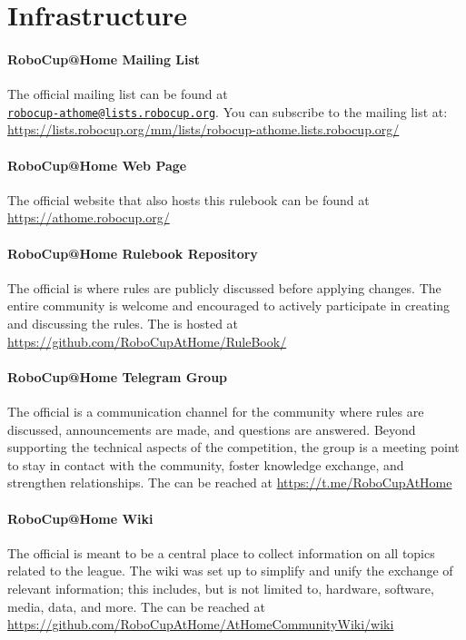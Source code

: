 \section{Infrastructure}\label{sec:introduction:infrastructure}

\paragraph{RoboCup@Home Mailing List}\label{sec:introduction:mailinglist}
The official \AtHome{} mailing list can be found at\\
\href{mailto:robocup-athome@lists.robocup.org}{\small\texttt{robocup-athome@lists.robocup.org}}.
You can subscribe to the mailing list at: {\small\url{https://lists.robocup.org/mm/lists/robocup-athome.lists.robocup.org/}}

\paragraph{RoboCup@Home Web Page}\label{sec:introduction:webpage}
The official \AtHome{} website that also hosts this rulebook can be found at {\small\url{https://athome.robocup.org/}}

\paragraph{RoboCup@Home Rulebook Repository}\label{sec:introduction:repo}
The official \AtHome{} \RR{} is where rules are publicly discussed before applying changes.
The entire \AtHome{} community is welcome and encouraged to actively participate in creating and discussing the rules.
The \RR{} is hosted at {\small\url{https://github.com/RoboCupAtHome/RuleBook/}}

\paragraph{RoboCup@Home Telegram Group}\label{sec:introduction:telegramgroup}
The official \AtHome{} \TG{} is a communication channel for the \AtHome{} community where rules are discussed, announcements are made, and questions are answered.
Beyond supporting the technical aspects of the competition, the group is a meeting point to stay in contact with the community, foster knowledge exchange, and strengthen relationships.
The \TG{} can be reached at {\small\url{https://t.me/RoboCupAtHome}}

\paragraph{RoboCup@Home Wiki}\label{sec:introduction:wiki}
The official \AtHome{} \WIKI{} is meant to be a central place to collect information on all topics related to the \AtHome{} league.
The wiki was set up to simplify and unify the exchange of relevant information; this includes, but is not limited to, hardware, software, media, data, and more.
The \WIKI{} can be reached at {\small\url{https://github.com/RoboCupAtHome/AtHomeCommunityWiki/wiki}}
